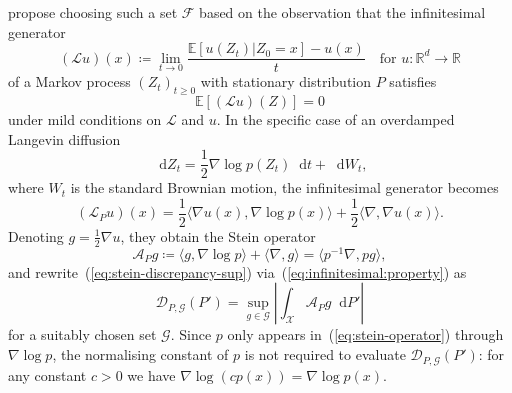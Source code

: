 \documentclass[11pt,a4paper]{report}
\newcommand*\diff{\mathop{}\!\mathrm{d}}
\begin{document}
\cite{gorhamMeasuringSampleQuality2015} propose choosing such a set $\mathcal{F}$ based on the observation that the infinitesimal generator
$$(\mathcal{L}u)(x) \coloneq \lim_{t \to 0} \frac{\mathbb{E}[u(Z_t) | Z_0 = x] - u(x)}{t} \quad \text{for } u:\mathbb{R}^d \to \mathbb{R}$$
of a Markov process $(Z_t)_{t \geq 0}$ with stationary distribution $P$ satisfies 
\begin{equation}
\mathbb{E}[(\mathcal{L} u)(Z)] = 0
\label{eq:infinitesimal:property}
\end{equation}
under mild conditions on $\mathcal{L}$ and $u$. In the specific case of an overdamped Langevin diffusion
$$\diff Z_t = \frac{1}{2} \nabla \log p(Z_t) \diff t + \diff W_t,$$
where $W_t$ is the standard Brownian motion, the infinitesimal generator becomes
$$(\mathcal{L}_P u)(x) = \frac{1}{2} \langle \nabla u(x), \nabla \log p(x)\rangle + \frac{1}{2}\langle \nabla, \nabla u(x) \rangle.$$
Denoting $g  = \frac{1}{2}\nabla u$, they obtain the Stein operator
\begin{equation}
\mathcal{A}_P g \coloneq \langle g, \nabla \log p \rangle + \langle \nabla, g \rangle = \langle p^{-1}\nabla, p g \rangle,
\label{eq:stein-operator}
\end{equation}
and rewrite~(\ref{eq:stein-discrepancy-sup}) via~(\ref{eq:infinitesimal:property}) as
\begin{equation}
\mathcal{D}_{P, \mathcal{G}}(P') = \sup_{g \in \mathcal{G}}\left|\int_\mathcal{X} \mathcal{A}_P g \diff P' \right|
\label{eq:stein-discrepancy-g}
\end{equation}
for a suitably chosen set $\mathcal{G}$. Since $p$ only appears in~(\ref{eq:stein-operator}) through $\nabla \log p$, the normalising constant of $p$ is not required to evaluate $\mathcal{D}_{P, \mathcal{G}}(P')$: for any constant $c > 0$ we have $\nabla \log (c p(x)) = \nabla \log p(x)$.
\end{document}
